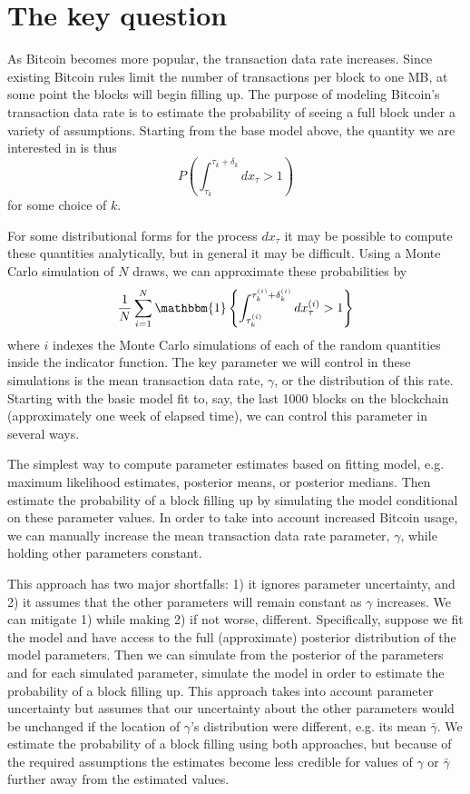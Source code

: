 \documentclass{article}
\begin{document}
\section{The key question}
As Bitcoin becomes more popular, the transaction data rate increases. Since existing Bitcoin rules limit the number of transactions per block to one MB, at some point the blocks will begin filling up. The purpose of modeling Bitcoin's transaction data rate is to estimate the probability of seeing a full block under a variety of assumptions. Starting from the base model above, the quantity we are interested in is thus
\[
P\left(\int_{\tau_k}^{\tau_{k}+\delta_k}dx_\tau > 1\right)
\]
for some choice of $k$. 

For some distributional forms for the process $dx_\tau$ it may be possible to compute these quantities analytically, but in general it may be difficult. Using a Monte Carlo simulation of $N$ draws, we can approximate these probabilities by
\[
\frac{1}{N}\sum_{i=1}^N\mathbbm{1}\left\{\int_{\tau_k^{(i)}}^{\tau_{k}^{(i)}+\delta_k^{(i)}}dx_\tau^{(i)} > 1\right\}
\]
where $i$ indexes the Monte Carlo simulations of each of the random quantities inside the indicator function. The key parameter we will control in these simulations is the mean transaction data rate, $\gamma$, or the distribution of this rate. Starting with the basic model fit to, say, the last 1000 blocks on the blockchain (approximately one week of elapsed time), we can control this parameter in several ways.

The simplest way to compute parameter estimates based on fitting model, e.g. maximum likelihood estimates, posterior means, or posterior medians. Then estimate the probability of a block filling up by simulating the model conditional on these parameter values. In order to take into account increased Bitcoin usage, we can manually increase the mean transaction data rate parameter, $\gamma$, while holding other parameters constant. 

This approach has two major shortfalls: 1) it ignores parameter uncertainty, and 2) it assumes that the other parameters will remain constant as $\gamma$ increases. We can mitigate 1) while making 2) if not worse, different. Specifically, suppose we fit the model and have access to the full (approximate) posterior distribution of the model parameters. Then we can simulate from the posterior of the parameters and for each simulated parameter, simulate the model in order to estimate the probability of a block filling up. This approach takes into account parameter uncertainty but assumes that our uncertainty about the other parameters would be unchanged if the location of $\gamma$'s distribution were different, e.g. its mean $\bar{\gamma}$. We estimate the probability of a block filling using both approaches, but because of the required assumptions the estimates become less credible for values of $\gamma$ or $\bar{\gamma}$ further away from the estimated values.
\end{document}
